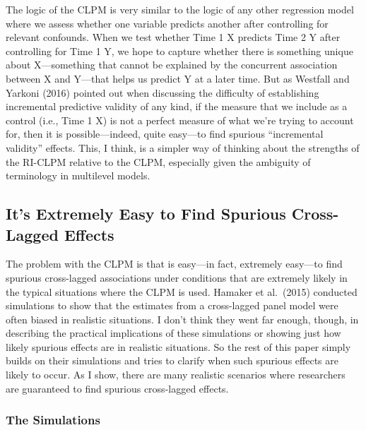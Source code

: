 \documentclass[
  english,
  man,floatsintext]{apa6}
\begin{document}
The logic of the CLPM is very similar to the logic of any other regression model where we assess whether one variable predicts another after controlling for relevant confounds. When we test whether Time 1 X predicts Time 2 Y after controlling for Time 1 Y, we hope to capture whether there is something unique about X---something that cannot be explained by the concurrent association between X and Y---that helps us predict Y at a later time. But as Westfall and Yarkoni (2016) pointed out when discussing the difficulty of establishing incremental predictive validity of any kind, if the measure that we include as a control (i.e., Time 1 X) is not a perfect measure of what we're trying to account for, then it is possible---indeed, quite easy---to find spurious ``incremental validity'' effects. This, I think, is a simpler way of thinking about the strengths of the RI-CLPM relative to the CLPM, especially given the ambiguity of terminology in multilevel models.

\hypertarget{its-extremely-easy-to-find-spurious-cross-lagged-effects}{%
\subsection{It's Extremely Easy to Find Spurious Cross-Lagged Effects}\label{its-extremely-easy-to-find-spurious-cross-lagged-effects}}

The problem with the CLPM is that is easy---in fact, extremely easy---to find spurious cross-lagged associations under conditions that are extremely likely in the typical situations where the CLPM is used. Hamaker et al.~(2015) conducted simulations to show that the estimates from a cross-lagged panel model were often biased in realistic situations. I don't think they went far enough, though, in describing the practical implications of these simulations or showing just how likely spurious effects are in realistic situations. So the rest of this paper simply builds on their simulations and tries to clarify when such spurious effects are likely to occur. As I show, there are many realistic scenarios where researchers are guaranteed to find spurious cross-lagged effects.

\hypertarget{the-simulations}{%
\subsubsection{The Simulations}\label{the-simulations}}
\end{document}
